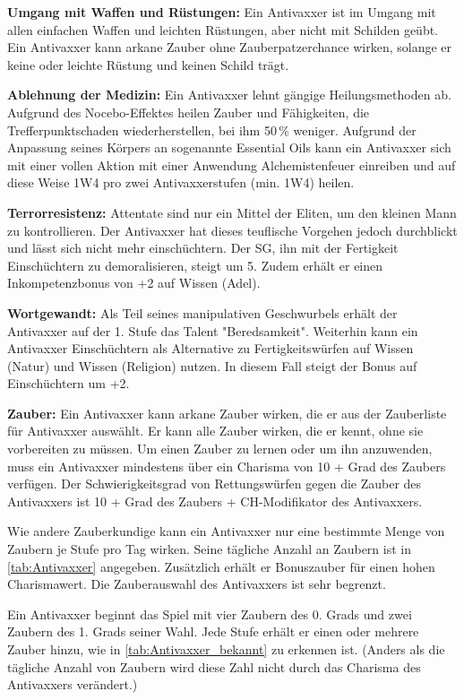 \documentclass[
	ngerman,
	a4paper,
	10pt,
	twocolumn,
]{scrartcl}
\begin{document}
\textbf{Umgang mit Waffen und Rüstungen:} Ein Antivaxxer ist im Umgang mit allen einfachen Waffen und leichten Rüstungen, aber nicht mit Schilden geübt. Ein Antivaxxer kann arkane Zauber ohne Zauberpatzerchance wirken, solange er keine oder leichte Rüstung und keinen Schild trägt.

\textbf{Ablehnung der Medizin:} Ein Antivaxxer lehnt gängige Heilungsmethoden ab. Aufgrund des Nocebo-Effektes heilen Zauber und Fähigkeiten, die Trefferpunktschaden wiederherstellen, bei ihm 50\,\% weniger. Aufgrund der Anpassung seines Körpers an sogenannte \glqq Essential Oils\grqq{} kann ein Antivaxxer sich mit einer vollen Aktion mit einer Anwendung Alchemistenfeuer einreiben und auf diese Weise 1W4 pro zwei Antivaxxerstufen (min. 1W4) heilen.

\textbf{Terrorresistenz:} Attentate sind nur ein Mittel der Eliten, um den kleinen Mann zu kontrollieren. Der Antivaxxer hat dieses teuflische Vorgehen jedoch durchblickt und lässt sich nicht mehr einschüchtern. Der SG, ihn mit der Fertigkeit Einschüchtern zu demoralisieren, steigt um 5. Zudem erhält er einen Inkompetenzbonus von +2 auf Wissen (Adel).

\textbf{Wortgewandt:} Als Teil seines manipulativen Geschwurbels erhält der Antivaxxer auf der 1. Stufe das Talent "Beredsamkeit". Weiterhin kann ein Antivaxxer Einschüchtern als Alternative zu Fertigkeitswürfen auf Wissen (Natur) und Wissen (Religion) nutzen. In diesem Fall steigt der Bonus auf Einschüchtern um +2.

\textbf{Zauber:} Ein Antivaxxer kann arkane Zauber wirken, die er aus der Zauberliste für Antivaxxer auswählt. Er kann alle Zauber wirken,  die er kennt, ohne sie vorbereiten zu müssen. Um einen Zauber zu lernen oder um ihn anzuwenden, muss ein Antivaxxer mindestens über ein Charisma von 10 + Grad des Zaubers verfügen. Der Schwierigkeitsgrad von Rettungswürfen gegen die Zauber des Antivaxxers ist 10 + Grad des Zaubers + CH-Modifikator des Antivaxxers.

Wie andere Zauberkundige kann ein Antivaxxer nur eine bestimmte Menge von Zaubern je Stufe pro Tag wirken. Seine tägliche Anzahl an Zaubern ist in \autoref{tab:Antivaxxer} angegeben. Zusätzlich erhält er Bonuszauber für einen hohen Charismawert. Die Zauberauswahl des Antivaxxers ist sehr begrenzt.

Ein Antivaxxer beginnt das Spiel mit vier Zaubern des 0. Grads und zwei Zaubern des 1. Grads seiner Wahl. Jede Stufe erhält er einen oder mehrere Zauber hinzu, wie in \autoref{tab:Antivaxxer_bekannt} zu erkennen ist. (Anders als die tägliche Anzahl von Zaubern wird diese Zahl nicht durch das Charisma des Antivaxxers verändert.)
\end{document}
